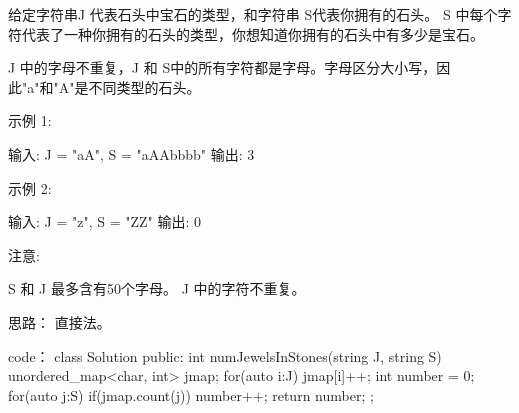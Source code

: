  给定字符串J 代表石头中宝石的类型，和字符串 S代表你拥有的石头。 S 中每个字符代表了一种你拥有的石头的类型，你想知道你拥有的石头中有多少是宝石。

J 中的字母不重复，J 和 S中的所有字符都是字母。字母区分大小写，因此"a"和"A"是不同类型的石头。

示例 1:

输入: J = "aA", S = "aAAbbbb"
输出: 3

示例 2:

输入: J = "z", S = "ZZ"
输出: 0

注意:

    S 和 J 最多含有50个字母。
     J 中的字符不重复。












思路：
直接法。


























code：
class Solution {
public:
    int numJewelsInStones(string J, string S) {
        unordered_map<char, int> jmap;
        for(auto i:J)
            jmap[i]++;
        int number = 0;
        for(auto j:S)
        {
            if(jmap.count(j)) number++;
        }
        return number;
    }
};